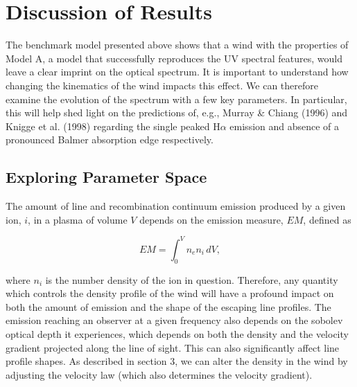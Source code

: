 \documentclass[preprint, a4paper, 11pt]{aastex}
\begin{document}








%
%

\section{Discussion of Results}

The benchmark model presented above shows that a wind with the properties
of Model A, a model that successfully reproduces the UV spectral features,
would leave a clear imprint on the optical spectrum. It is important
to understand how changing the kinematics of the wind impacts this
effect. We can therefore examine the evolution
of the spectrum with a few key parameters. In particular, this
will help shed light on the predictions of, e.g., Murray \& Chiang (1996)
and Knigge et al. (1998) regarding the single peaked H$\alpha$ emission
and absence of a pronounced Balmer absorption edge respectively.

\subsection{Exploring Parameter Space}

The amount of line and recombination continuum
emission produced by a given ion, $i$, in a plasma of volume $V$
depends on the emission measure, $EM$, defined as

\begin{equation}
EM=\int^V_0 n_e n_i \,dV,
\end{equation}


where $n_i$ is the number density of the ion in question.    
Therefore, any quantity which controls the density profile of the wind
will have a profound impact on both the 
amount of emission and the shape of the escaping line profiles.
The emission reaching an observer at a given frequency
also depends on the sobolev optical depth it experiences, which depends on both
the density and the velocity gradient projected
along the line of sight. This can also significantly affect line profile shapes.       
As described in section 3, we can alter the density in the wind by 
adjusting the velocity law (which also determines the velocity gradient). 
\end{document}
